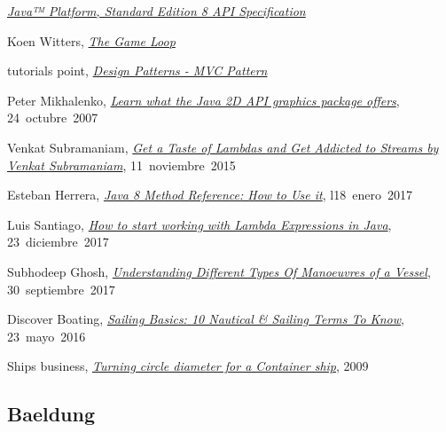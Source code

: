 


\href{https://docs.oracle.com/javase/8/docs/api/}{\textit{Java™ Platform, Standard Edition 8
		API Specification}}

Koen Witters,
\href{https://dewitters.com/dewitters-gameloop/}{\textit{The Game Loop}}

tutorials point,
\href{https://www.tutorialspoint.com/design_pattern/mvc_pattern.htm}{\textit{Design Patterns - MVC Pattern}}

Peter Mikhalenko,
\href{https://www.techrepublic.com/blog/software-engineer/learn-what-the-java-2d-api-graphics-package-offers/}{\textit{Learn what the Java 2D API graphics package offers}},
\mbox{24 octubre 2007}

Venkat Subramaniam,
\href{https://youtu.be/1OpAgZvYXLQ}{\textit{Get a Taste of Lambdas and Get Addicted to Streams by Venkat Subramaniam}},
\mbox{11 noviembre 2015}

Esteban Herrera,
\href{https://www.codementor.io/eh3rrera/using-java-8-method-reference-du10866vx}{\textit{Java 8 Method Reference: How to Use it}},
\mbox{l18 enero 2017}

Luis Santiago,
\href{https://www.freecodecamp.org/news/learn-these-4-things-and-working-with-lambda-expressions-b0ab36e0fffc/}{\textit{How to start working with Lambda Expressions in Java}},
\mbox{23 diciembre 2017}

Subhodeep Ghosh,
\href{https://www.marineinsight.com/naval-architecture/different-types-of-manoeuvres-of-a-vessel/}{\textit{Understanding Different Types Of Manoeuvres of a Vessel}},
\mbox{30 septiembre 2017}

Discover Boating,
\href{https://www.discoverboating.com/resources/sailing-basics-10-nautical-sailing-terms-to-know}{\textit{Sailing Basics: 10 Nautical \& Sailing Terms To Know}},
\mbox{23 mayo 2016}

Ships business,
\href{http://shipsbusiness.com/turning-circle.html}{\textit{Turning circle diameter for a Container ship}},
\mbox{2009}

\subsection*{Baeldung}

